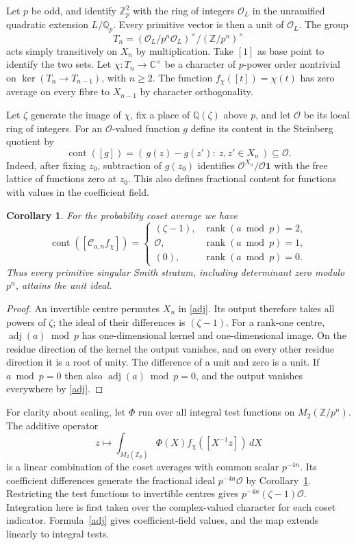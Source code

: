 \documentclass[11pt]{article}
\newtheorem{corollary}[theorem]{Corollary}
\newcommand{\Zp}{\mathbb Z_p}
\newcommand{\Qp}{\mathbb Q_p}
\newcommand{\OO}{\mathcal O}
\newcommand{\adj}{\operatorname{adj}}
\newcommand{\cont}{\operatorname{cont}}
\begin{document}
Let $p$ be odd, and identify $\Zp^2$ with the ring of integers
$\OO_L$ in the unramified quadratic extension $L/\Qp$. Every
primitive vector is then a unit of $\OO_L$. The group
\[
 T_n=(\OO_L/p^n\OO_L)^\times/(\mathbb Z/p^n)^\times
\]
acts simply transitively on $X_n$ by multiplication. Take $[1]$ as
base point to identify the two sets. Let $\chi:T_n\to\mathbb C^\times$
be a character of $p$-power order nontrivial on
$\ker(T_n\to T_{n-1})$, with $n\ge2$. The function
$f_\chi([t])=\chi(t)$ has zero average on every fibre to $X_{n-1}$
by character orthogonality.

Let $\zeta$ generate the image of $\chi$, fix a place of
$\mathbb Q(\zeta)$ above $p$, and let $\OO$ be its local ring of
integers. For an $\OO$-valued function $g$ define its content in
the Steinberg quotient by
\[
 \cont([g])=(\,g(z)-g(z'):\ z,z'\in X_n\,)\subseteq \OO .
\]
Indeed, after fixing $z_0$, subtraction of $g(z_0)$ identifies
$\OO^{X_n}/\OO\mathbf1$ with the free lattice of functions zero
at $z_0$. This also defines fractional content for functions with
values in the coefficient field.

\begin{corollary}\label{ct}
For the probability coset average we have
\[
 \cont([\mathcal C_{a,n} f_\chi])=
 \begin{cases}
  (\zeta-1),&\operatorname{rank}(a\bmod p)=2,\\
  \OO,&\operatorname{rank}(a\bmod p)=1,\\
  (0),&\operatorname{rank}(a\bmod p)=0.
 \end{cases}
\]
Thus every primitive singular Smith stratum, including determinant
zero modulo $p^n$, attains the unit ideal.
\end{corollary}

\begin{proof}
An invertible centre permutes $X_n$ in \eqref{adj}. Its output
therefore takes all powers of $\zeta$; the ideal of their differences
is $(\zeta-1)$. For a rank-one centre, $\adj(a)\bmod p$ has
one-dimensional kernel and one-dimensional image. On the residue
direction of the kernel the output vanishes, and on every other
residue direction it is a root of unity. The difference of a unit
and zero is a unit. If $a\bmod p=0$ then also $\adj(a)\bmod p=0$,
and the output vanishes everywhere by \eqref{adj}.
\end{proof}

For clarity about scaling, let $\Phi$ run over all integral test
functions on $M_2(\mathbb Z/p^n)$. The additive operator
\[
 z\longmapsto \int_{M_2(\Zp)}\Phi(X)f_\chi([X^{-1}z])\,dX
\]
is a linear combination of the coset averages with common scalar
$p^{-4n}$. Its coefficient differences generate the fractional
ideal $p^{-4n}\OO$ by Corollary~\ref{ct}. Restricting the test
functions to invertible centres gives $p^{-4n}(\zeta-1)\OO$.
Integration here is first taken over the complex-valued character
for each coset indicator. Formula~\eqref{adj} gives coefficient-field
values, and the map extends linearly to integral tests.
\end{document}
